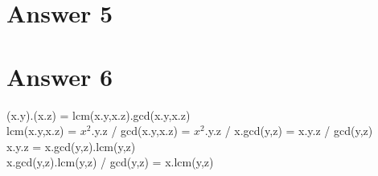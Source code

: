 \documentclass[12pt]{article}
\begin{document}
\section*{Answer 5}


\section*{Answer 6}
(x.y).(x.z) = lcm(x.y,x.z).gcd(x.y,x.z) \\
lcm(x.y,x.z) = $x^{2}$.y.z / gcd(x.y,x.z) = $x^{2}$.y.z / x.gcd(y,z) = x.y.z / gcd(y,z) \\
x.y.z = x.gcd(y,z).lcm(y,z) \\
x.gcd(y,z).lcm(y,z) / gcd(y,z) = x.lcm(y,z) \\
\end{document}
